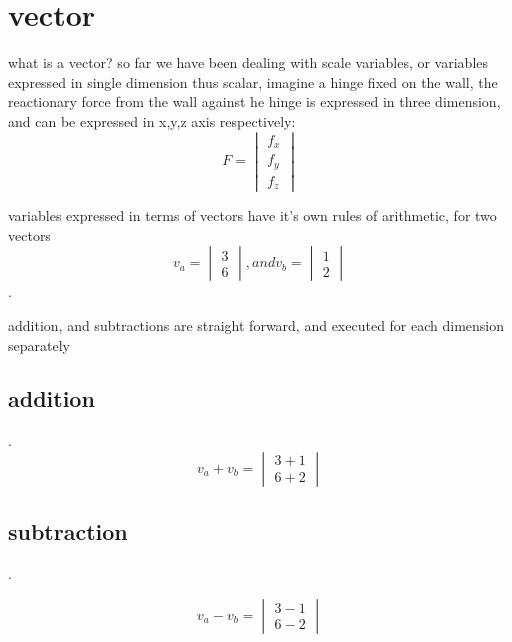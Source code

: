 \documentclass[4apaper,12pt]{book}
\begin{document}
  \section{vector}
  \begin{description}
  \item what is a vector? so far we have been dealing with scale variables, or variables expressed in single dimension thus scalar, imagine a hinge fixed on the wall, the reactionary force from the wall against he hinge is expressed in three dimension, and can be expressed in x,y,z axis respectively:
    \begin{equation} F=\begin{vmatrix}f_x\\f_y\\f_z\end{vmatrix} \end{equation}
  \item variables expressed in terms of vectors have it's own rules of arithmetic, for two vectors
    \begin{equation} v_a = \begin{vmatrix}3\\6\end{vmatrix}, and v_b = \begin{vmatrix}1\\2\end{vmatrix} \end{equation}.
  \item addition, and subtractions are straight forward, and executed for each dimension separately
    \subsection{addition}
    \begin{description}
      \item .
       \begin{equation} v_a + v_b = \begin{vmatrix}3+1\\6+2\end{vmatrix} \end{equation}
      \end{description}
    \subsection{subtraction}
    \begin{description}
      \item .
      \item \begin{equation} v_a - v_b = \begin{vmatrix}3-1\\6-2\end{vmatrix} \end{equation}
      \end{description}

\end{description}
\end{document}
